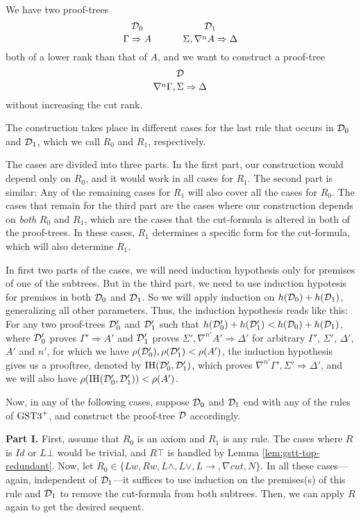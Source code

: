 
    We have two proof-trees
    \[
      \genfrac{}{}{0pt}{}{\D_0}{\Gamma \Rightarrow A}
      \hspace{3em}
      \genfrac{}{}{0pt}{}{\D_1}{\Sigma, \nabla^n A \Rightarrow \Delta}
    \]
    both of a lower rank than that of $A$, and we want to construct a proof-tree
    \[\genfrac{}{}{0pt}{}{\D}{\nabla^n \Gamma, \Sigma \Rightarrow \Delta} \]
    without increasing the cut rank.
  
    The construction takes place in different cases for the last rule that occurs in $\mathcal{D}_0$ and $\mathcal{D}_1$, which we call $R_0$ and $R_1$, respectively.

    The cases are divided into three parts. In the first part, our construction would depend only on $R_0$, and it would work in all cases for $R_1$. The second part is similar: Any of the remaining cases for $R_1$ will also cover all the cases for $R_0$. The cases that remain for the third part are the cases where our construction depends on \emph{both} $R_0$ and $R_1$, which are the cases that the cut-formula is altered in both of the proof-trees. In these cases, $R_1$ determines a specific form for the cut-formula, which will also determine $R_1$.
  
    In first two parts of the cases, we will need induction hypothesis only for premises of one of the subtrees. But in the third part, we need to use induction hypotesis for premises in both $\mathcal{D}_0$ and $\mathcal{D}_1$. So we will apply induction on $h(\mathcal{D}_0) + h(\mathcal{D}_1)$, generalizing all other parameters. Thus, the induction hypothesis reads like this: For any two proof-trees $\mathcal{D}_0'$ and $\mathcal{D}_1'$ such that $h(\mathcal{D}_0') + h(\mathcal{D}_1') < h(\mathcal{D}_0) + h(\mathcal{D}_1)$, where $\mathcal{D}_0'$ proves $\Gamma' \Rightarrow A'$ and $\mathcal{D}_1'$ proves $\Sigma', \nabla^{n'} A'\Rightarrow \Delta'$ for arbitrary $\Gamma'$, $\Sigma'$, $\Delta'$, $A'$ and $n'$, for which we have $\rho(\mathcal{D}_0'),\rho(\mathcal{D}_1') < \rho(A')$, the induction hypothesis gives us a prooftree, denoted by $\text{IH}(\mathcal{D}_0', \mathcal{D}_1')$, which proves $\nabla^{n'}\Gamma', \Sigma' \Rightarrow \Delta'$, and we will also have $\rho(\text{IH}(\mathcal{D}_0', \mathcal{D}_1')) < \rho(A')$.
  
    Now, in any of the following cases, suppose $\mathcal{D}_0$ and $\mathcal{D}_1$ end with any of the rules of $\text{GST3}^+$, and construct the proof-tree $\mathcal{D}$ accordingly.

    \textbf{Part I.} First, assume that $R_0$ is an axiom and $R_1$ is any rule. The cases where $R$ is $Id$ or $L \bot$ would be trivial, and $R \top$ is handled by Lemma \ref{lem:gstt-top-redundant}.
    Now, let $R_0 \in \{ Lw, Rw, L \wedge, L \vee, L \rightarrow, \nabla cut, N \}$. In all these cases---again, independent of $\mathcal{D}_1$---it suffices to use induction on the premises(s) of this rule and $\mathcal{D}_1$ to remove the cut-formula from both subtrees. Then, we can apply $R$ again to get the desired sequent.\\
  
